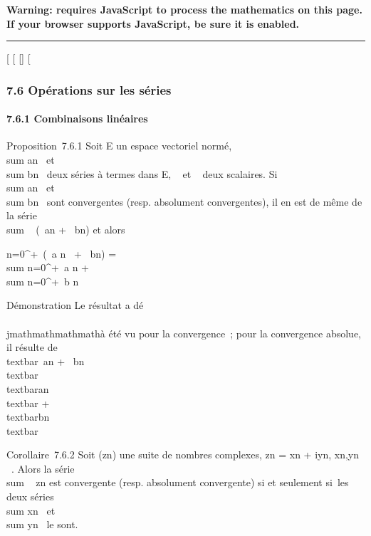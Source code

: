 \textbf{Warning: 
requires JavaScript to process the mathematics on this page.\\ If your
browser supports JavaScript, be sure it is enabled.}

\begin{center}\rule{3in}{0.4pt}\end{center}

{[}
{[}
{[}{]}
{[}

\subsubsection{7.6 Opérations sur les séries}

\paragraph{7.6.1 Combinaisons linéaires}

Proposition~7.6.1 Soit E un espace vectoriel normé,
\\sum  an~ et
\\sum  bn~ deux
séries à termes dans E, \alpha~ et \beta~ deux scalaires. Si
\\sum  an~ et
\\sum  bn~ sont
convergentes (resp. absolument convergentes), il en est de même de la
série \\sum ~
(\alpha~an + \beta~bn) et alors

\sum n=0^+\infty~(\alpha~a n~ +
\beta~bn) = \alpha~\\sum
n=0^+\infty~a n + \beta~\\sum
n=0^+\infty~b n

Démonstration Le résultat a dé\\\\jmathmathmathmathà été vu pour la convergence~; pour la
convergence absolue, il résulte de
\\textbar{}\alpha~an +
\beta~bn\\textbar{}
\leq\textbar{}\alpha~\textbar{}\,\\textbar{}an\\textbar{}
+
\textbar{}\beta~\textbar{}\,\\textbar{}bn\\textbar{}

Corollaire~7.6.2 Soit (zn) une suite de nombres complexes,
zn = xn + iyn, xn,yn \in
{}~. Alors la série \\sum ~
zn est convergente (resp. absolument convergente) si et
seulement si~les deux séries
\\sum  xn~ et
\\sum  yn~ le
sont.

